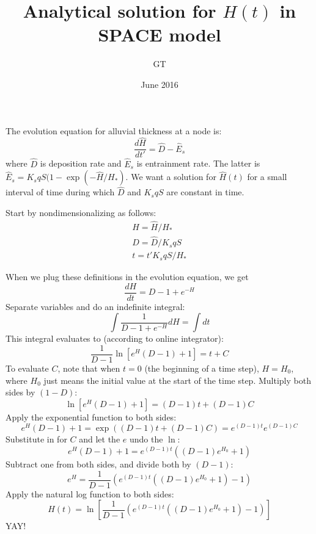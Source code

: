 \documentclass[11pt]{amsart}
\title{Analytical solution for $H(t)$ in SPACE model}
\author{GT}
\date{June 2016}                                           %
\begin{document}
\maketitle

The evolution equation for alluvial thickness at a node is:
\begin{equation}
\frac{d\hat{H}}{dt'} = \hat{D} - \hat{E}_s
\end{equation}
where $\hat{D}$ is deposition rate and $\hat{E}_s$ is entrainment rate. The latter is $\hat{E}_s = K_s q S (1-\exp(-\hat{H}/H_*)$. We want a solution for $\hat{H}(t)$ for a small interval of time during which $\hat{D}$ and $K_s q S$ are constant in time.

Start by nondimensionalizing as follows:
\begin{eqnarray}
H = \hat{H} / H_* \\
D = \hat{D} / K_s q S \\
t = t' K_s q S / H_*
\end{eqnarray}

When we plug these definitions in the evolution equation, we get
\begin{equation}
\frac{dH}{dt} = D - 1 + e^{-H}
\end{equation}
Separate variables and do an indefinite integral:
\begin{equation}
\int \frac{1}{D - 1 + e^{-H}} dH = \int dt
\end{equation}
This integral evaluates to (according to online integrator):
\begin{equation}
\frac{1}{D-1} \ln \left[ e^{H} (D-1) + 1 \right] = t + C
\end{equation}
To evaluate $C$, note that when $t=0$ (the beginning of a time step), $H=H_0$, where $H_0$ just means the initial value at the start of the time step. Multiply both sides by $(1-D)$:
\begin{equation}
\ln \left[ e^{H} (D-1) + 1 \right] = (D-1)t + (D-1) C
\end{equation}
Apply the exponential function to both sides:
\begin{equation}
e^H (D-1) + 1= \exp( (D-1)t + (D-1) C ) = e^{(D-1)t} e^{(D-1)C}
\end{equation}
Substitute in for $C$ and let the $e$ undo the $\ln$:
\begin{equation}
e^H (D-1) + 1= e^{(D-1)t} \left( (D-1) e^{H_0}  + 1 \right)
\end{equation}
Subtract one from both sides, and divide both by $(D-1)$:
\begin{equation}
e^H = \frac{1}{D-1} \left( e^{(D-1)t} \left( (D-1) e^{H_0}  + 1 \right) - 1 \right)
\end{equation}
Apply the natural log function to both sides:
\begin{equation}
H(t) = \ln \left[ \frac{1}{D-1} \left( e^{(D-1)t} \left( (D-1) e^{H_0}  + 1 \right) - 1 \right) \right]
\end{equation}
YAY!
\end{document}
